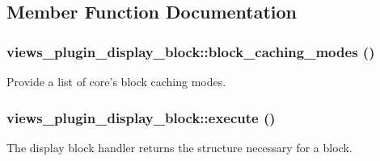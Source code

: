 \subsection{Member Function Documentation}
\hypertarget{classviews__plugin__display__block_ac5a9a1d276df4c6a01a3076be5e4f0aa}{
\subsubsection[{block\_\-caching\_\-modes}]{\setlength{\rightskip}{0pt plus 5cm}views\_\-plugin\_\-display\_\-block::block\_\-caching\_\-modes ()}}
\label{classviews__plugin__display__block_ac5a9a1d276df4c6a01a3076be5e4f0aa}
Provide a list of core's block caching modes. \hypertarget{classviews__plugin__display__block_ad673f5b3462304a522ead4293a8f7cef}{
\subsubsection[{execute}]{\setlength{\rightskip}{0pt plus 5cm}views\_\-plugin\_\-display\_\-block::execute ()}}
\label{classviews__plugin__display__block_ad673f5b3462304a522ead4293a8f7cef}
The display block handler returns the structure necessary for a block. 

